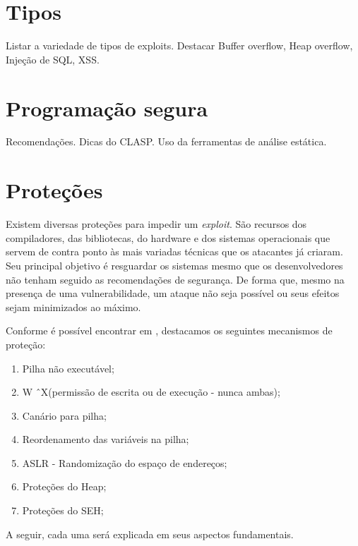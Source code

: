 	\section{Tipos}
		
		Listar a variedade de tipos de exploits.
		Destacar Buffer overflow, Heap overflow, Injeção de SQL, XSS.

	\section{Programação segura}
		Recomendações. Dicas do CLASP.
		Uso da ferramentas de análise estática.
	
	\section{Proteções}
	\label{sec:exploit_protection}
		Existem diversas proteções para impedir um \textsl{exploit}.
		São recursos dos compiladores, das bibliotecas, do hardware e dos sistemas operacionais
		que servem de contra ponto às mais variadas técnicas que os atacantes já criaram.
		Seu principal objetivo é resguardar os sistemas mesmo que os desenvolvedores
		não tenham seguido as recomendações de segurança. De forma que, mesmo na presença de uma
		vulnerabilidade, um ataque não seja possível ou seus efeitos sejam minimizados ao máximo.
		
		
		Conforme é possível encontrar em \cite{Anley2007}, destacamos os seguintes mecanismos
		de proteção:
		\begin{enumerate}
			\item{Pilha não executável;}
			\item{W \^\ X(permissão de escrita ou de execução - nunca ambas);}
			\item{Canário para pilha;}
			\item{Reordenamento das variáveis na pilha;}
			\item{ASLR - Randomização do espaço de endereços;}
			\item{Proteções do Heap;}
			\item{Proteções do SEH;}
		\end{enumerate}

		A seguir, cada uma será explicada em seus aspectos fundamentais.
	
